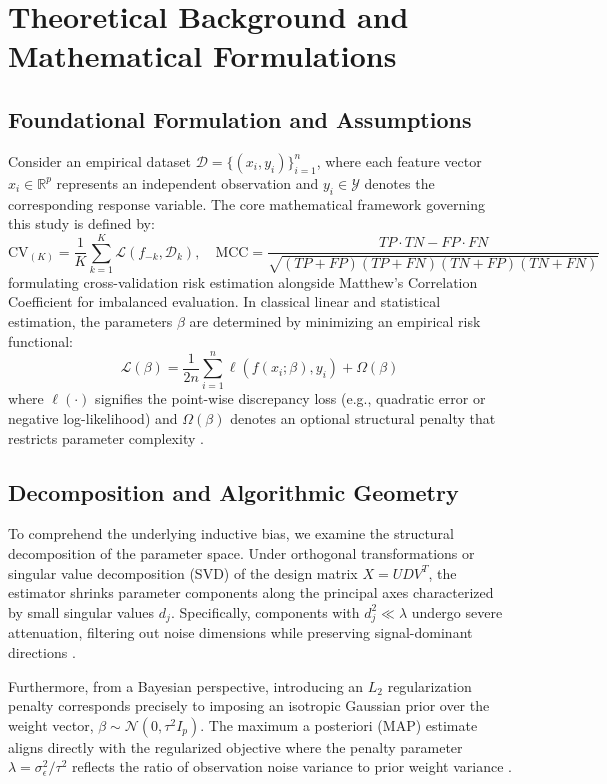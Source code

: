 \section{Theoretical Background and Mathematical Formulations}

\subsection{Foundational Formulation and Assumptions}
Consider an empirical dataset $\mathcal{D} = \{(x_i, y_i)\}_{i=1}^n$, where each feature vector $x_i \in \mathbb{R}^p$ represents an independent observation and $y_i \in \mathcal{Y}$ denotes the corresponding response variable. The core mathematical framework governing this study is defined by:
\begin{equation}
  \text{CV}_{(K)} = \frac{1}{K} \sum_{k=1}^K \mathcal{L}(f_{-k}, \mathcal{D}_k), \quad \text{MCC} = \frac{TP \cdot TN - FP \cdot FN}{\sqrt{(TP+FP)(TP+FN)(TN+FP)(TN+FN)}}
\label{eq:core_math}
\end{equation}
formulating cross-validation risk estimation alongside Matthew's Correlation Coefficient for imbalanced evaluation.
In classical linear and statistical estimation, the parameters $\beta$ are determined by minimizing an empirical risk functional:
\begin{equation}
  \mathcal{L}(\beta) = \frac{1}{2n} \sum_{i=1}^n \ell(f(x_i; \beta), y_i) + \Omega(\beta)
\end{equation}
where $\ell(\cdot)$ signifies the point-wise discrepancy loss (e.g., quadratic error or negative log-likelihood) and $\Omega(\beta)$ denotes an optional structural penalty that restricts parameter complexity \cite{bishop2006}.

\subsection{Decomposition and Algorithmic Geometry}
To comprehend the underlying inductive bias, we examine the structural decomposition of the parameter space. Under orthogonal transformations or singular value decomposition (SVD) of the design matrix $X = U D V^T$, the estimator shrinks parameter components along the principal axes characterized by small singular values $d_j$. Specifically, components with $d_j^2 \ll \lambda$ undergo severe attenuation, filtering out noise dimensions while preserving signal-dominant directions \cite{hoerl1970}.

Furthermore, from a Bayesian perspective, introducing an $L_2$ regularization penalty corresponds precisely to imposing an isotropic Gaussian prior over the weight vector, $\beta \sim \mathcal{N}(0, \tau^2 I_p)$. The maximum a posteriori (MAP) estimate aligns directly with the regularized objective where the penalty parameter $\lambda = \sigma_\epsilon^2 / \tau^2$ reflects the ratio of observation noise variance to prior weight variance \cite{murphy2012}.

